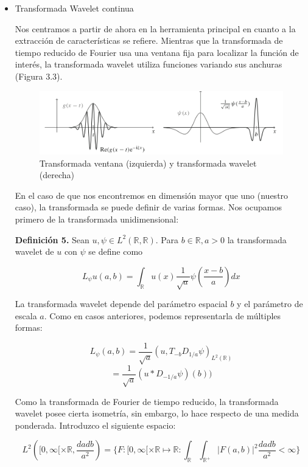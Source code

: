 \begin{itemize}
\item Transformada Wavelet continua

Nos centramos a partir de ahora en la herramienta principal en cuanto a la extracción de características se refiere. Mientras que la transformada de tiempo reducido de Fourier usa una ventana fija para localizar la función de interés, la transformada wavelet utiliza funciones variando sus anchuras (Figura 3.3). 

 \begin{figure}[H] %
	\centering
	\includegraphics[scale=0.42]{widths.png}  %
	\caption{Transformada ventana (izquierda) y transformada wavelet (derecha)} 
	\label{fig:widths}
\end{figure}

En el caso de que nos encontremos en dimensión mayor que uno (nuestro caso), la transformada se puede definir de varias formas. Nos ocupamos primero de la transformada unidimensional:

\textbf{Definición 5.} Sean $u, \psi \in L^2(\mathbb{R},\mathbb{R})$. Para $b \in \mathbb{R}, a>0$ la transformada wavelet de $u$ con $\psi$ se define como

$$L_\psi u(a,b) = \int_{\mathbb{R}} u(x) \frac{1}{\sqrt{a}} \psi\left(\frac{x-b}{a}\right) dx$$

La transformada wavelet depende del parámetro espacial $b$ y el parámetro de escala $a$. Como en casos anteriores, podemos representarla de múltiples formas:

$$L_\psi (a,b) = \frac{1}{\sqrt{a}} (u, T_{-b}D_{1/a}\psi)_{L^2(\mathbb{R})}$$
$$=\frac{1}{\sqrt{a}} (u*D_{-1/a}\psi)(b))$$

Como la transformada de Fourier de tiempo reducido, la transformada wavelet posee cierta isometría, sin embargo, lo hace respecto de una medida ponderada. Introduzco el siguiente espacio:

$$L^2 \left( [0,\infty[ \times \mathbb{R}, \frac{da db}{a^2}\right) = \{ F: [0,\infty[ \times \mathbb{R} \mapsto \mathbb{R}: \int_{\mathbb{R}} \int_{\mathbb{R}^+} |F(a,b)|^2 \frac{da db}{a^2} < \infty \} $$


\end{itemize}
